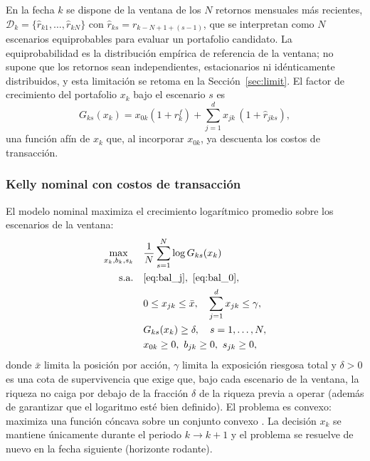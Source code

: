 En la fecha $k$ se dispone de la ventana de los $N$ retornos mensuales más recientes, $\mathcal D_k=\{\hat r_{k1},\dots,\hat r_{kN}\}$ con $\hat r_{ks}=r_{k-N+1+(s-1)}$, 
que se interpretan como $N$ escenarios equiprobables para evaluar un portafolio candidato. La equiprobabilidad es la distribución empírica de referencia de la ventana; no supone que los retornos sean independientes, estacionarios ni idénticamente distribuidos, y esta limitación se retoma en la Sección~\ref{sec:limit}.
 El factor de crecimiento del portafolio $x_k$ bajo el escenario $s$ es
\begin{equation}\label{eq:G}
G_{ks}(x_k)=x_{0k}(1+r^f_k)+\sum_{j=1}^{d}x_{jk}\,(1+\hat r_{jks}),
\end{equation}
una función afín de $x_k$ que, al incorporar $x_{0k}$, ya descuenta los costos de transacción.

\subsubsection{Kelly nominal con costos de transacción}

El modelo nominal maximiza el crecimiento logarítmico promedio sobre los escenarios de la ventana:
\begin{equation}\label{eq:nominal}
\begin{aligned}
\max_{x_k,b_k,s_k}\quad & \frac1N\sum_{s=1}^N\log G_{ks}(x_k)\\
\text{s.a.}\quad & \eqref{eq:bal_j},\ \eqref{eq:bal_0},\\
& 0\le x_{jk}\le \bar x,\quad \sum_{j=1}^d x_{jk}\le\gamma,\\
& G_{ks}(x_k)\ge\delta,\quad s=1,\dots,N,\\
& x_{0k}\ge0,\ b_{jk}\ge0,\ s_{jk}\ge0,
\end{aligned}
\end{equation}
donde $\bar x$ limita la posición por acción, $\gamma$ limita la exposición riesgosa total y $\delta>0$ es una cota de supervivencia \citep{hsiehyu2024} que exige que, bajo cada escenario de la ventana, la riqueza no caiga por debajo de la fracción $\delta$ de la riqueza previa a operar (además de garantizar que el logaritmo esté bien definido). El problema es convexo: maximiza una función cóncava sobre un conjunto convexo \citep{kelly1956,breiman1961}. La decisión $x_k$ se mantiene únicamente durante el periodo $k\to k+1$ y el problema se resuelve de nuevo en la fecha siguiente (horizonte rodante).

